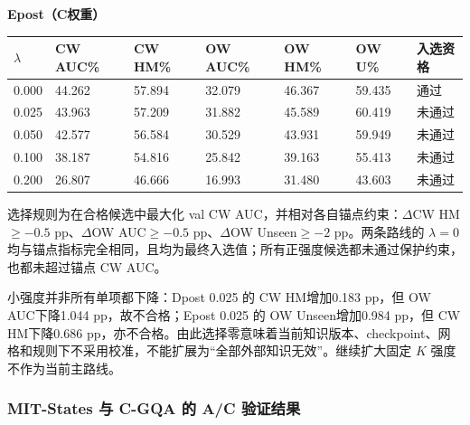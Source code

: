 \documentclass[12pt,a4paper,UTF8]{ctexart}
\newenvironment{reporttable}{\par\smallskip\begingroup\small\centering}{\par\endgroup\smallskip}
\begin{document}
\noindent\textbf{Epost（C权重）}

\begin{reporttable}

\footnotesize

\begin{tabularx}{\linewidth}{|Z|Z|Z|Z|Z|Z|Z|}
\hline

\textbf{$\lambda$} & \textbf{CW AUC\%} & \textbf{CW HM\%} & \textbf{OW AUC\%} & \textbf{OW HM\%} & \textbf{OW U\%} & \textbf{入选资格} \\ \hline

0.000 & 44.262 & 57.894 & 32.079 & 46.367 & 59.435 & 通过 \\ \hline

0.025 & 43.963 & 57.209 & 31.882 & 45.589 & 60.419 & 未通过 \\ \hline

0.050 & 42.577 & 56.584 & 30.529 & 43.931 & 59.949 & 未通过 \\ \hline

0.100 & 38.187 & 54.816 & 25.842 & 39.163 & 55.413 & 未通过 \\ \hline

0.200 & 26.807 & 46.666 & 16.993 & 31.480 & 43.603 & 未通过 \\ \hline

\end{tabularx}\end{reporttable}

选择规则为在合格候选中最大化 val CW AUC，并相对各自锚点约束：$\Delta$CW HM$\ge-0.5$ pp、$\Delta$OW AUC$\ge-0.5$ pp、$\Delta$OW Unseen$\ge-2$ pp。两条路线的 $\lambda=0$ 均与锚点指标完全相同，且均为最终入选值；所有正强度候选都未通过保护约束，也都未超过锚点 CW AUC。

小强度并非所有单项都下降：Dpost 0.025 的 CW HM增加0.183 pp，但 OW AUC下降1.044 pp，故不合格；Epost 0.025 的 OW Unseen增加0.984 pp，但 CW HM下降0.686 pp，亦不合格。由此选择零意味着当前知识版本、checkpoint、网格和规则下不采用校准，不能扩展为“全部外部知识无效”。继续扩大固定 $K$ 强度不作为当前主路线。
\subsubsection{MIT-States 与 C-GQA 的 A/C 验证结果}
\end{document}

